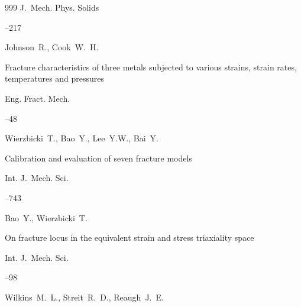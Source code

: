 \begin{thebibliography}{999}
\jour J.~Mech. Phys. Solids




--217





\by Johnson~R., Cook~W.~H. 

\paper Fracture characteristics of three metals subjected to various strains, strain rates, temperatures and pressures

\jour Eng. Fract. Mech.




--48





\by Wierzbicki~T., Bao~Y., Lee~Y.W., Bai~Y.  

\paper Calibration and evaluation of seven fracture models

\jour Int. J.~Mech. Sci.




--743






\by Bao~Y., Wierzbicki~T. 

\paper On fracture locus in the equivalent strain and stress triaxiality space

\jour Int. J.~Mech. Sci.




--98






\by Wilkins~M.~L., Streit~R.~D., Reaugh~J.~E.


\end{thebibliography}
